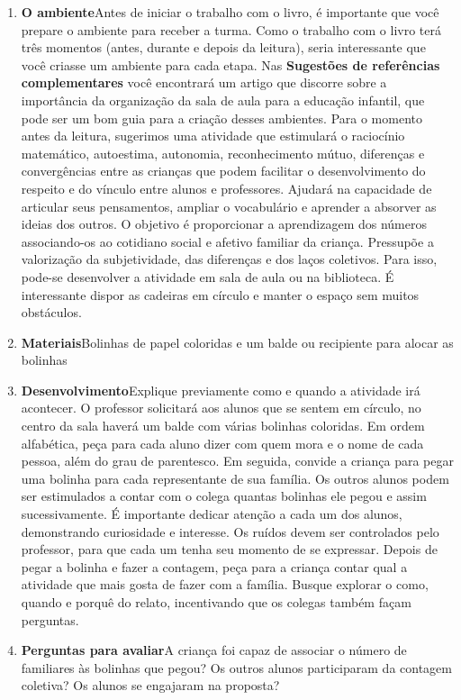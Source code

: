 \documentclass[11pt]{extarticle}
\begin{document}
\begin{enumerate}
\item \textbf{O ambiente}\quad Antes de iniciar o trabalho com o livro, é importante que você 
prepare o ambiente para receber a turma. Como o trabalho com o livro terá 
três momentos (antes, durante e depois da leitura), seria interessante que você 
criasse um ambiente para cada etapa. Nas \textbf{Sugestões de referências complementares} 
você encontrará um artigo que discorre sobre a importância da organização da sala 
de aula para a educação infantil, que pode ser um bom guia para a criação desses 
ambientes.
Para o momento antes da leitura, sugerimos uma atividade que estimulará o raciocínio matemático, autoestima, autonomia, reconhecimento mútuo, diferenças e convergências entre as crianças que podem facilitar o desenvolvimento do respeito e do vínculo entre alunos e professores. Ajudará na capacidade de articular seus pensamentos, ampliar o vocabulário e aprender a absorver as ideias dos outros. O objetivo  é proporcionar a aprendizagem dos números associando-os ao cotidiano social e afetivo familiar da criança. Pressupõe a valorização da subjetividade, das diferenças e dos laços coletivos. 
Para isso, pode-se desenvolver a atividade em sala de aula ou na biblioteca.
É interessante dispor as cadeiras em círculo e manter o espaço sem muitos obstáculos.  

\item \textbf{Materiais}\quad Bolinhas de papel coloridas e um balde ou recipiente para alocar as bolinhas

\item \textbf{Desenvolvimento}\quad Explique previamente como e quando a atividade irá acontecer. O professor solicitará aos alunos que se sentem em círculo, no centro da sala haverá um balde com várias bolinhas coloridas. Em ordem alfabética, peça para cada aluno dizer com quem mora e o nome de cada pessoa, além do grau de parentesco. Em seguida, convide a criança para pegar uma bolinha para cada representante de sua família. Os outros alunos podem ser estimulados a contar com o colega quantas bolinhas ele pegou e assim sucessivamente. É importante dedicar atenção a cada um dos alunos, demonstrando curiosidade e interesse. Os ruídos devem ser controlados pelo professor, para que cada um tenha seu momento de se expressar. Depois de pegar a bolinha e fazer a contagem, peça para a criança contar qual a atividade que mais gosta de fazer com a família. Busque explorar o como, quando e porquê do relato, incentivando que os colegas também façam perguntas.

\item \textbf{Perguntas para avaliar}\quad A criança foi capaz de associar o número de familiares às bolinhas que pegou? Os outros alunos participaram da contagem coletiva? Os alunos se engajaram na proposta?  

\end{enumerate}
\end{document}
